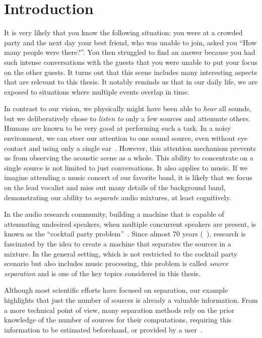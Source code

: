 \chapter{Introduction}\label{ch:introduction}

It is very likely that you know the following situation: you were at a crowded party and the next day your best friend, who was unable to join, asked you ``How many people were there?''.
You then struggled to find an answer because you had such intense conversations with the guests that you were unable to put your focus on the other guests.
It turns out that this scene includes many interesting aspects that are relevant to this thesis. It notably reminds us that in our daily life, we are exposed to situations where multiple events overlap in time.
\par
In contrast to our vision, we physically might have been able to \emph{hear} all sounds, but we deliberatively chose to \emph{listen to} only a few sources and attenuate others.
Humans are known to be very good at performing such a task.
In a noisy environment, we can steer our attention to one sound source, even without eye contact and using only a single ear~\cite{bregman90}.
However, this attention mechanism prevents us from observing the acoustic scene as a whole.
This ability to concentrate on a single source is not limited to just conversations. 
It also applies to music. If we imagine attending a music concert of our favorite band, it is likely that we focus on the lead vocalist and miss out many details of the background band, demonstrating our ability to \emph{separate} audio mixtures, at least cognitively.
\par
In the audio research community, building a machine that is capable of attenuating undesired speakers, when multiple concurrent speakers are present, is known as the ``cocktail party problem''~\cite{haykin05}. 
Since almost 70 years (~\cite{cherry53}), research is fascinated by the idea to create a machine that separates the sources in a mixture.
In the general setting, which is not restricted to the cocktail party scenario but also includes music processing, this problem is called \emph{source separation} and is one of the key topics considered in this thesis.
\par
Although most scientific efforts have focused on separation, our example highlights that just the number of sources is already a valuable information.
From a more technical point of view, many separation methods rely on the prior knowledge of the number of sources for their computations, requiring this information to be estimated beforehand, or provided by a user~\cite{liutkus13}.
